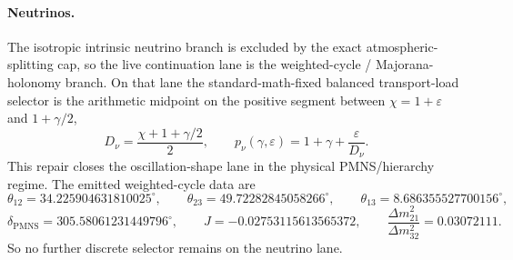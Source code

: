 \documentclass[11pt]{article}
\begin{document}
\paragraph{Neutrinos.}\label{step5-neutrino-continuation}
The isotropic intrinsic neutrino branch is excluded by the exact atmospheric-splitting cap, so the live continuation lane is the weighted-cycle / Majorana-holonomy branch. On that lane the standard-math-fixed balanced transport-load selector is the arithmetic midpoint on the positive segment between \(\chi=1+\varepsilon\) and \(1+\gamma/2\),
\[
D_\nu=\frac{\chi+1+\gamma/2}{2},
\qquad
p_\nu(\gamma,\varepsilon)=1+\gamma+\frac{\varepsilon}{D_\nu}.
\]
This repair closes the oscillation-shape lane in the physical PMNS/hierarchy regime. The emitted weighted-cycle data are
\[
\theta_{12}=34.225904631810025^\circ,\qquad
\theta_{23}=49.72282845058266^\circ,\qquad
\theta_{13}=8.686355527700156^\circ,
\]
\[
\delta_{\mathrm{PMNS}}=305.58061231449796^\circ,\qquad
J=-0.02753115613565372,\qquad
\frac{\Delta m_{21}^2}{\Delta m_{32}^2}=0.03072111.
\]
So no further discrete selector remains on the neutrino lane.
\end{document}
